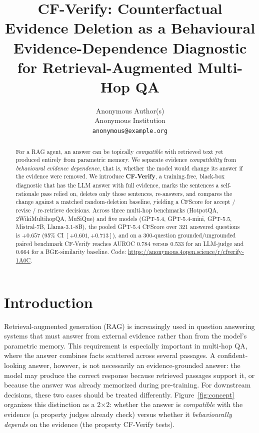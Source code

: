 \documentclass[11pt]{article}
\title{CF-Verify: Counterfactual Evidence Deletion as a Behavioural\\Evidence-Dependence Diagnostic for Retrieval-Augmented Multi-Hop QA}
\author{Anonymous Author(s) \\ Anonymous Institution \\ \texttt{anonymous@example.org}}
\begin{document}
\pdfpagewidth=8.5in
\pdfpageheight=11in

\maketitle

\begin{abstract}
For a RAG agent, an answer can be topically \emph{compatible} with retrieved text yet produced entirely from parametric memory. We separate evidence \emph{compatibility} from \emph{behavioural evidence dependence}, that is, whether the model would change its answer if the evidence were removed. We introduce \textbf{CF-Verify}, a training-free, black-box diagnostic that has the LLM answer with full evidence, marks the sentences a self-rationale pass relied on, deletes only those sentences, re-answers, and compares the change against a matched random-deletion baseline, yielding a CFScore for accept / revise / re-retrieve decisions. Across three multi-hop benchmarks (HotpotQA, 2WikiMultihopQA, MuSiQue) and five models (GPT-5.4, GPT-5.4-mini, GPT-5.5, Mistral-7B, Llama-3.1-8B), the pooled GPT-5.4 CFScore over 321 answered questions is $+0.657$ (95\% CI $[+0.601, +0.713]$), and on a 300-question grounded/ungrounded paired benchmark CF-Verify reaches AUROC 0.784 versus 0.533 for an LLM-judge and 0.664 for a BGE-similarity baseline. Code: \url{https://anonymous.4open.science/r/cfverify-1A0C}.
\end{abstract}

\section{Introduction}
\label{sec:intro}

Retrieval-augmented generation (RAG) is increasingly used in question answering systems that must answer from external evidence rather than from the model's parametric memory. This requirement is especially important in multi-hop QA, where the answer combines facts scattered across several passages. A confident-looking answer, however, is not necessarily an evidence-grounded answer: the model may produce the correct response because retrieved passages support it, or because the answer was already memorized during pre-training. For downstream decisions, these two cases should be treated differently. Figure~\ref{fig:concept} organizes this distinction as a 2$\times$2: whether the answer is \emph{compatible} with the evidence (a property judges already check) versus whether it \emph{behaviourally depends} on the evidence (the property CF-Verify tests).
\end{document}
